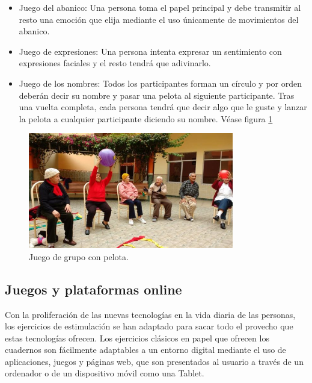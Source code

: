 \begin{itemize}
	\item{Juego del abanico: Una persona toma el papel principal y debe transmitir al resto una emoción que elija mediante el uso únicamente de movimientos del abanico.}

	\item{Juego de expresiones: Una persona intenta expresar un sentimiento con expresiones faciales y el resto tendrá que adivinarlo.}

	\item{Juego de los nombres: Todos los participantes forman un círculo y por orden deberán decir su nombre y pasar una pelota al siguiente participante. Tras una vuelta completa, cada persona tendrá que decir algo que le guste y lanzar la pelota a cualquier participante diciendo su nombre. Véase figura \ref{fig:EA_juegosAncianos}}

\end{itemize}


\begin{figure}
  \centering
\includegraphics[width=0.8\textwidth]{03.EstudioProblema/01.EstadoArte/00.Figuras/04.juegos_ancianos.jpg}
    \caption{Juego de grupo con pelota. \cite{EA_img_juegoGrupoPelota}}
    \label{fig:EA_juegosAncianos}
\end{figure}

\subsection{Juegos y plataformas online}

Con la proliferación de las nuevas tecnologías en la vida diaria de las personas, los ejercicios de estimulación se han adaptado para sacar todo el provecho que estas tecnologías ofrecen. Los ejercicios clásicos en papel que ofrecen los cuadernos son fácilmente adaptables a un entorno digital mediante el uso de aplicaciones, juegos y páginas web, que son presentados al usuario a través de un ordenador o de un dispositivo móvil como una Tablet.

